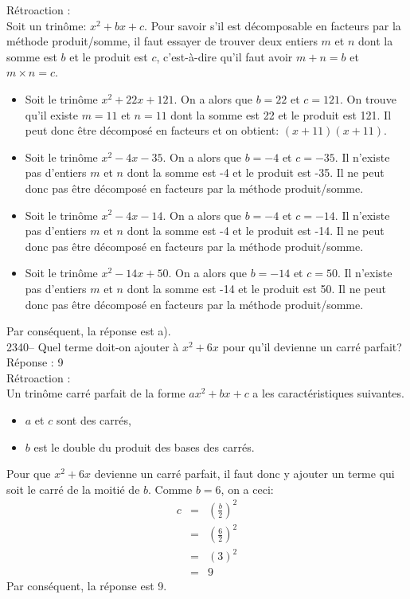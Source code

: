 \documentclass[letterpaper, 12pt]{article}
\begin{document}
R\'etroaction :\\
Soit un trin\^ome: $x^{2}+bx+c$. Pour savoir s'il est d\'ecomposable en facteurs par la m\'ethode produit/somme, il faut essayer de trouver deux entiers $m$ et $n$ dont la somme est $b$ et le produit est $c$, c'est-\`a-dire qu'il faut avoir $m+n=b$ et $m\times n=c$.\\
\begin{itemize}
\item Soit le trin\^ome $x^{2}+22x+121$. On a alors que $b=22$ et $c=121$. On trouve qu'il existe $m=11$ et $n=11$ dont la somme est 22 et le produit est 121. Il peut donc \^etre d\'ecompos\'e en facteurs et on obtient: $(x+11)(x+11)$.\\
\item Soit le trin\^ome $x^{2}-4x-35$. On a alors que $b=-4$ et $c=-35$. Il n'existe pas d'entiers $m$ et $n$ dont la somme est -4 et le produit est -35. Il ne peut donc pas \^etre d\'ecompos\'e en facteurs par la m\'ethode produit/somme.\\
\item Soit le trin\^ome $x^{2}-4x-14$. On a alors que $b=-4$ et $c=-14$. Il n'existe pas d'entiers $m$ et $n$ dont la somme est -4 et le produit est -14. Il ne peut donc pas \^etre d\'ecompos\'e en facteurs par la m\'ethode produit/somme.\\
\item Soit le trin\^ome $x^{2}-14x+50$. On a alors que $b=-14$ et $c=50$. Il n'existe pas d'entiers $m$ et $n$ dont la somme est -14 et le produit est 50. Il ne peut donc pas \^etre d\'ecompos\'e en facteurs par la m\'ethode produit/somme.\\
\end{itemize}
Par cons\'equent, la r\'eponse est a).\\

2340-- Quel terme doit-on ajouter \`a $x^{2}+6x$ pour qu'il devienne un carr\'e parfait?\\

R\'eponse : 9\\

R\'etroaction :\\
Un trin\^ome carr\'e parfait de la forme $ax^{2}+bx+c$ a les caract\'eristiques suivantes.
\begin{itemize}
\item $a$ et $c$ sont des carr\'es,
\item $b$ est le double du produit des bases des carr\'es.\\
\end{itemize}
Pour que $x^{2}+6x$ devienne un carr\'e parfait, il faut donc y ajouter un terme qui soit le carr\'e de la moiti\'e de $b$. Comme $b=6$, on a ceci:
\begin{eqnarray*}
c&=&\left(\frac{b}{2}\right)^{2}\\[2mm]
&=&\left(\frac{6}{2}\right)^{2}\\[2mm]
&=&(3)^{2}\\[2mm]
&=&9
\end{eqnarray*}
Par cons\'equent, la r\'eponse est 9.\\
\end{document}
